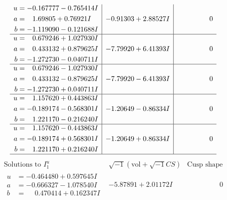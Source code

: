 \documentclass[1p]{elsarticle_modified}
\theoremstyle{definition}
\newcommand{\I}{\sqrt{-1}}
\begin{document}
$$\begin{array}{c|c|c}
\begin{aligned}
u &= -0.167777 - 0.765414 I \\
a &= \phantom{-}1.69805 + 0.76921 I \\
b &= -1.119090 - 0.121688 I\end{aligned}
 & -0.91303 + 2.88527 I & \phantom{-0.000000 } 0 \\ \hline\begin{aligned}
u &= \phantom{-}0.679246 + 1.027930 I \\
a &= \phantom{-}0.433132 + 0.879625 I \\
b &= -1.272730 - 0.040711 I\end{aligned}
 & -7.79920 + 6.41393 I & \phantom{-0.000000 } 0 \\ \hline\begin{aligned}
u &= \phantom{-}0.679246 - 1.027930 I \\
a &= \phantom{-}0.433132 - 0.879625 I \\
b &= -1.272730 + 0.040711 I\end{aligned}
 & -7.79920 - 6.41393 I & \phantom{-0.000000 } 0 \\ \hline\begin{aligned}
u &= \phantom{-}1.157620 + 0.443863 I \\
a &= -0.189174 - 0.568301 I \\
b &= \phantom{-}1.221170 - 0.216240 I\end{aligned}
 & -1.20649 - 0.86334 I & \phantom{-0.000000 } 0 \\ \hline\begin{aligned}
u &= \phantom{-}1.157620 - 0.443863 I \\
a &= -0.189174 + 0.568301 I \\
b &= \phantom{-}1.221170 + 0.216240 I\end{aligned}
 & -1.20649 + 0.86334 I & \phantom{-0.000000 } 0\\
 \hline 
 \end{array}$$\newpage$$\begin{array}{c|c|c}  
\text{Solutions to }I^u_{1}& \I (\text{vol} + \sqrt{-1}CS) & \text{Cusp shape}\\
 \hline 
\begin{aligned}
u &= -0.464480 + 0.597645 I \\
a &= -0.666327 - 1.078540 I \\
b &= \phantom{-}0.470414 + 0.162347 I\end{aligned}
 & -5.87891 + 2.01172 I & \phantom{-0.000000 } 0 \\ \hline\begin{aligned}

\end{aligned}
\end{array}$$
\end{document}
